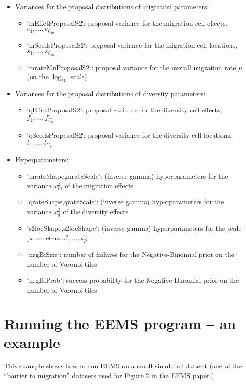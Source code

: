\documentclass[a4paper,10pt,DIV=15,mpinclude=true]{scrartcl}
\begin{document}
\begin{itemize}
\item Variances for the proposal distributions of migration parameters:
\begin{itemize}
  \item `mEffctProposalS2`: proposal variance for the migration cell effects, $e_1,\ldots,e_{C_m}$
  \item `mSeedsProposalS2`: proposal variance for the migration cell locations, $s_1,\ldots,s_{C_m}$
  \item `mrateMuProposalS2`: proposal variance for the overall migration rate $\mu$ (on the $\log_{10}$ scale)
\end{itemize}
\item Variances for the proposal distributions of diversity parameters:
\begin{itemize}
  \item `qEffctProposalS2`: proposal variance for the diversity cell effects, $f_1,\ldots,f_{C_q}$
  \item `qSeedsProposalS2`: proposal variance for the diversity cell locations, $t_1,\ldots,t_{C_q}$
\end{itemize}
\item Hyperparameters:
\begin{itemize}
  \item `mrateShape,mrateScale`: (inverse gamma) hyperparameters for the variance $\omega_m^2$ of the migration effects
  \item `qrateShape,qrateScale`: (inverse gamma) hyperparameters for the variance $\omega_q^2$ of the diversity effects
  \item `s2locShape,s2locShape`: (inverse gamma) hyperparameters for the scale parameters $\sigma_1^2,\ldots,\sigma_p^2$
  \item `negBiSize`: number of failures for the Negative-Binomial prior on the number of Voronoi tiles
  \item `negBiProb`: success probability for the Negative-Binomial prior on the number of Voronoi tiles
\end{itemize}
\end{itemize}

\newpage
\section{Running the EEMS program -- an example}\label{sec:running-eems}

This example shows how to run EEMS on a small simulated dataset (one of the ``barrier to migration'' datasets used for Figure 2 in the EEMS paper.)
\end{document}
